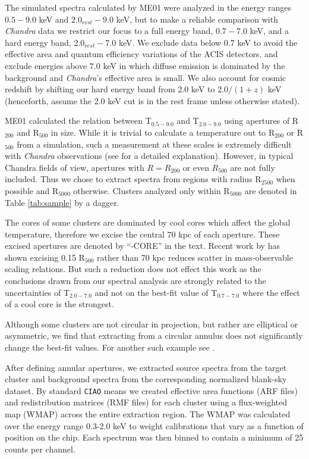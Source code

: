 \documentclass{emulateapj}
\newcommand{\hard}{T$_{2.0-7.0}$ }
\newcommand{\full}{T$_{0.7-7.0}$ }
\begin{document}
The simulated spectra calculated by ME01 were analyzed in the energy
ranges $0.5-9.0$ keV and $2.0_{rest}-9.0$ keV, but to make a reliable
comparison with {\textit{Chandra}} data we restrict our focus to a
full energy band, $0.7-7.0$ keV, and a hard energy band,
$2.0_{rest}-7.0$ keV. We exclude data below $0.7$ keV to avoid the
effective area and quantum efficiency variations of the ACIS
detectors, and exclude energies above $7.0$ keV in which diffuse
emission is dominated by the background and {\textit{Chandra}'s}
effective area is small. We also account for cosmic redshift by
shifting our hard energy band from 2.0 keV to $2.0/(1+z)$
keV (henceforth, assume the 2.0 keV cut is in the rest frame unless
otherwise stated).

ME01 calculated the relation between
T$_{0.5-9.0}$ and T$_{2.0-9.0}$ using apertures of R$_{200}$ and
R$_{500}$ in size. While it is trivial to calculate a temperature out
to R$_{200}$ or R$_{500}$ from a simulation, such a measurement at
these scales is extremely difficult with {\textit{Chandra}}
observations (see \cite{2005ApJ...628..655V} for a detailed
explanation).  However, in typical Chandra fields of view, apertures
with $R=R_{200}$ or even $R_{500}$ are not fully included. Thus we
chose to extract spectra from regions with radius R$_{2500}$ when
possible and R$_{5000}$ otherwise. Clusters analyzed only within
R$_{5000}$ are denoted in Table \ref{tab:sample} by a dagger.

The cores of some clusters are dominated by cool cores which affect
the global temperature, therefore we excise the central 70 kpc of each
aperture. These excised apertures are denoted by ``-CORE'' in the
text. Recent work by \cite{2007astro.ph..3504M} has shown excising
0.15 R$_{500}$ rather than 70 kpc reduces scatter in mass-observable
scaling relations. But such a reduction does not effect this work as
the conclusions drawn from our spectral analysis are strongly related
to the uncertainties of \hard and not on the best-fit value of \full
where the effect of a cool core is the strongest.

Although some clusters are not circular in projection, but rather are
elliptical or asymmetric, we find that extracting from a circular
annulus does not significantly change the best-fit values. For another
such example see \cite{2005MNRAS.359.1481B}.

After defining annular apertures, we extracted source spectra from the
target cluster and background spectra from the corresponding
normalized blank-sky dataset. By standard {\tt CIAO} means we created
effective area functions (ARF files) and redistribution matrices (RMF
files) for each cluster using a flux-weighted map (WMAP) across the
entire extraction region. The WMAP was calculated over the energy
range 0.3-2.0 keV to  weight calibrations that vary as a function of
position on the chip. Each spectrum was then binned to contain a
minimum of 25 counts per channel.
\end{document}
